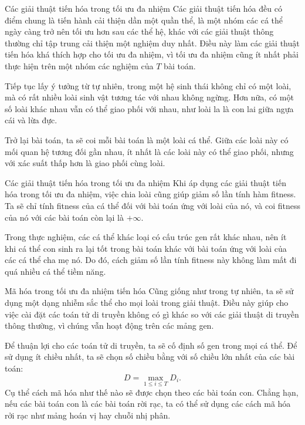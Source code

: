 \begin{frame}{Các giải thuật tiến hóa trong tối ưu đa nhiệm}
Các giải thuật tiến hóa đều có điểm chung là tiến hành cải thiện dần một quần
thể, là một nhóm các cá thể ngày càng trở nên tối ưu hơn sau các thể hệ, khác
với các giải thuật thông thường chỉ tập trung cải thiện một nghiệm duy nhất.
Điều này làm các giải thuật tiến hóa khá thích hợp cho tối ưu đa nhiệm, vì tối
ưu đa nhiệm cũng ít nhất phải thực hiện trên một nhóm các nghiệm của $T$ bài
toán.

Tiếp tục lấy ý tưởng từ tự nhiên, trong một hệ sinh thái không chỉ có một loài,
mà có rất nhiều loài sinh vật tương tác với nhau không ngừng. Hơn nữa, có một số
loài khác nhau vẫn có thể giao phối với nhau, như loài la là con lai giữa ngựa
cái và lừa đực.

Trở lại bài toán, ta sẽ coi mỗi bài toán là một loài cá thể. Giữa các loài này
có mối quan hệ tương đối gần nhau, ít nhất là các loài này có thể giao phối,
nhưng với xác suất thấp hơn là giao phối cùng loài.
\end{frame}

\begin{frame}{Các giải thuật tiến hóa trong tối ưu đa nhiệm}
  Khi áp dụng các giải thuật tiến hóa trong tối ưu đa nhiệm, việc chia loài cũng
  giúp giảm số lần tính hàm fitness. Ta sẽ chỉ tính fitness của cá thể đối với
  bài toán ứng với loài của nó, và coi fitness của nó với các bài toán còn lại
  là \( +\infty \).

  Trong thực nghiệm, các cá thể khác loại có cấu trúc gen rất khác nhau, nên ít
  khi cá thể con sinh ra lại tốt trong bài toán khác với bài toán ứng với loài
  của các cá thể cha mẹ nó. Do đó, cách giảm số lần tính fitness này không làm
  mất đi quá nhiều cá thể tiềm năng.
\end{frame}

\begin{frame}{Mã hóa trong tối ưu đa nhiệm tiến hóa}
  Cũng giống như trong tự nhiên, ta sẽ sử dụng một dạng nhiễm sắc thể cho mọi
  loài trong giải thuật. Điều này giúp cho việc cài đặt các toán tử di truyền
  không có gì khác so với các giải thuật di truyền thông thường, vì chúng vẫn
  hoạt động trên các mảng gen.

  Để thuận lợi cho các toán tử di truyền, ta sẽ cố định số gen trong mọi cá thể.
  Để sử dụng ít chiều nhất, ta sẽ chọn số chiều bằng với số chiều lớn nhất của
  các bài toán:
  \[
    D = \max\limits_{1 \le i \le T} D_{i}
  .\] 
  Cụ thể cách mã hóa như thế nào sẽ được chọn theo các bài toán con. Chẳng hạn,
  nếu các bài toán con là các bài toán rời rạc, ta có thể sử dụng các cách mã
  hóa rởi rạc như mảng hoán vị hay chuỗi nhị phân.
\end{frame}

